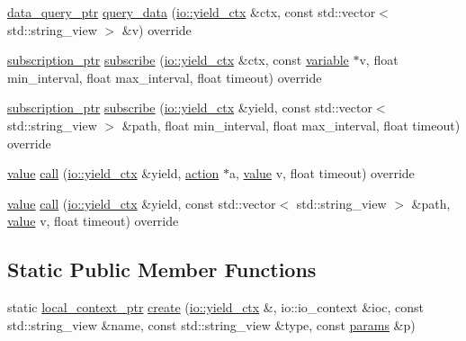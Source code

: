 \begin{DoxyCompactItemize}
\item 
\hyperlink{namespacetelegraph_a6ffe775ac48dca2a4013b53d692199c8}{data\+\_\+query\+\_\+ptr} \hyperlink{classtelegraph_1_1tmp__archive_a8a860d67e3733e2eee7a8315942450e5}{query\+\_\+data} (\hyperlink{structboost_1_1asio_1_1yield__ctx}{io\+::yield\+\_\+ctx} \&ctx, const std\+::vector$<$ std\+::string\+\_\+view $>$ \&v) override
\item 
\hyperlink{namespacetelegraph_a58641aa5b1a2cbdb0431916a87069f64}{subscription\+\_\+ptr} \hyperlink{classtelegraph_1_1tmp__archive_a10adc383103f4183e0a37485a5406cf1}{subscribe} (\hyperlink{structboost_1_1asio_1_1yield__ctx}{io\+::yield\+\_\+ctx} \&ctx, const \hyperlink{classtelegraph_1_1variable}{variable} $\ast$v, float min\+\_\+interval, float max\+\_\+interval, float timeout) override
\item 
\hyperlink{namespacetelegraph_a58641aa5b1a2cbdb0431916a87069f64}{subscription\+\_\+ptr} \hyperlink{classtelegraph_1_1tmp__archive_a9cf4be673f860b875b085c1ecac913ff}{subscribe} (\hyperlink{structboost_1_1asio_1_1yield__ctx}{io\+::yield\+\_\+ctx} \&yield, const std\+::vector$<$ std\+::string\+\_\+view $>$ \&path, float min\+\_\+interval, float max\+\_\+interval, float timeout) override
\item 
\hyperlink{classtelegraph_1_1value}{value} \hyperlink{classtelegraph_1_1tmp__archive_a9edb8a731ef989f40ae06e4b6c63c0be}{call} (\hyperlink{structboost_1_1asio_1_1yield__ctx}{io\+::yield\+\_\+ctx} \&yield, \hyperlink{classtelegraph_1_1action}{action} $\ast$a, \hyperlink{classtelegraph_1_1value}{value} v, float timeout) override
\item 
\hyperlink{classtelegraph_1_1value}{value} \hyperlink{classtelegraph_1_1tmp__archive_a1ccf8c90f14b36f3a09a501e0931e42e}{call} (\hyperlink{structboost_1_1asio_1_1yield__ctx}{io\+::yield\+\_\+ctx} \&yield, const std\+::vector$<$ std\+::string\+\_\+view $>$ \&path, \hyperlink{classtelegraph_1_1value}{value} v, float timeout) override
\end{DoxyCompactItemize}
\subsection*{Static Public Member Functions}
\begin{DoxyCompactItemize}
\item 
static \hyperlink{namespacetelegraph_ab59c7b38d99a98b4acc22433c920b1e6}{local\+\_\+context\+\_\+ptr} \hyperlink{classtelegraph_1_1tmp__archive_a3e59e0a0a2ef78286399fd6f67b4431d}{create} (\hyperlink{structboost_1_1asio_1_1yield__ctx}{io\+::yield\+\_\+ctx} \&, io\+::io\+\_\+context \&ioc, const std\+::string\+\_\+view \&name, const std\+::string\+\_\+view \&type, const \hyperlink{classtelegraph_1_1params}{params} \&p)
\end{DoxyCompactItemize}
